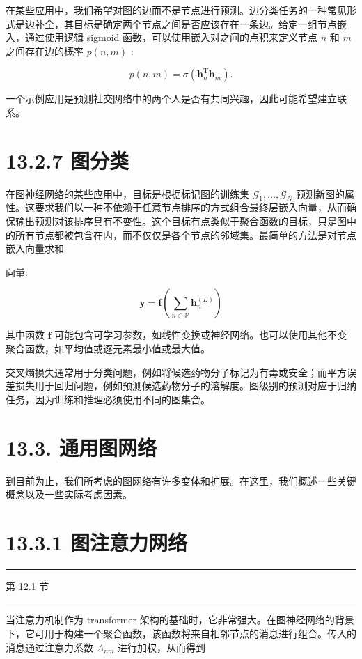 \documentclass[10pt]{report}
\newcommand{\HRule}{\begin{center}\rule{0.9\linewidth}{0.2mm}\end{center}}
\begin{document}
在某些应用中，我们希望对图的边而不是节点进行预测。边分类任务的一种常见形式是边补全，其目标是确定两个节点之间是否应该存在一条边。给定一组节点嵌入，通过使用逻辑 sigmoid 函数，可以使用嵌入对之间的点积来定义节点 \(n\) 和 \(m\) 之间存在边的概率 \(p\left( {n,m}\right)\) :

\[
p\left( {n,m}\right)  = \sigma \left( {{\mathbf{h}}_{n}^{\mathrm{T}}{\mathbf{h}}_{m}}\right) . \tag{13.22}
\]

一个示例应用是预测社交网络中的两个人是否有共同兴趣，因此可能希望建立联系。

\section*{13.2.7 图分类}

在图神经网络的某些应用中，目标是根据标记图的训练集 \({\mathcal{G}}_{1},\ldots ,{\mathcal{G}}_{N}\) 预测新图的属性。这要求我们以一种不依赖于任意节点排序的方式组合最终层嵌入向量，从而确保输出预测对该排序具有不变性。这个目标有点类似于聚合函数的目标，只是图中的所有节点都被包含在内，而不仅仅是各个节点的邻域集。最简单的方法是对节点嵌入向量求和

向量:

\[
\mathbf{y} = \mathbf{f}\left( {\mathop{\sum }\limits_{{n \in  \mathcal{V}}}{\mathbf{h}}_{n}^{\left( L\right) }}\right)  \tag{13.23}
\]

其中函数 \(\mathbf{f}\) 可能包含可学习参数，如线性变换或神经网络。也可以使用其他不变聚合函数，如平均值或逐元素最小值或最大值。

交叉熵损失通常用于分类问题，例如将候选药物分子标记为有毒或安全；而平方误差损失用于回归问题，例如预测候选药物分子的溶解度。图级别的预测对应于归纳任务，因为训练和推理必须使用不同的图集合。

\section*{13.3. 通用图网络}

到目前为止，我们所考虑的图网络有许多变体和扩展。在这里，我们概述一些关键概念以及一些实际考虑因素。

\section*{13.3.1 图注意力网络}

\HRule

第 12.1 节

\HRule

当注意力机制作为 transformer 架构的基础时，它非常强大。在图神经网络的背景下，它可用于构建一个聚合函数，该函数将来自相邻节点的消息进行组合。传入的消息通过注意力系数 \({A}_{nm}\) 进行加权，从而得到
\end{document}
